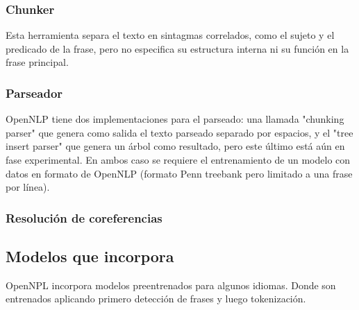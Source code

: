 \subsubsection{Chunker}
 Esta herramienta separa el texto en sintagmas correlados, como el sujeto y el predicado de la frase, pero no especifica su estructura interna ni su función en la frase principal. 
\subsubsection{Parseador}
 OpenNLP tiene dos implementaciones para el parseado: una llamada "chunking parser" que genera como salida el texto parseado separado por espacios, y el "tree insert parser" que genera un árbol como resultado, pero este último está aún en fase experimental. En ambos caso se requiere el entrenamiento de un modelo con datos en formato de OpenNLP (formato Penn treebank pero limitado a una frase por línea).
\subsubsection{Resolución de coreferencias}
 
\subsection{Modelos que incorpora}
OpenNPL incorpora modelos preentrenados para algunos idiomas. Donde  son entrenados aplicando primero detección de frases y luego tokenización. 

 
  



 